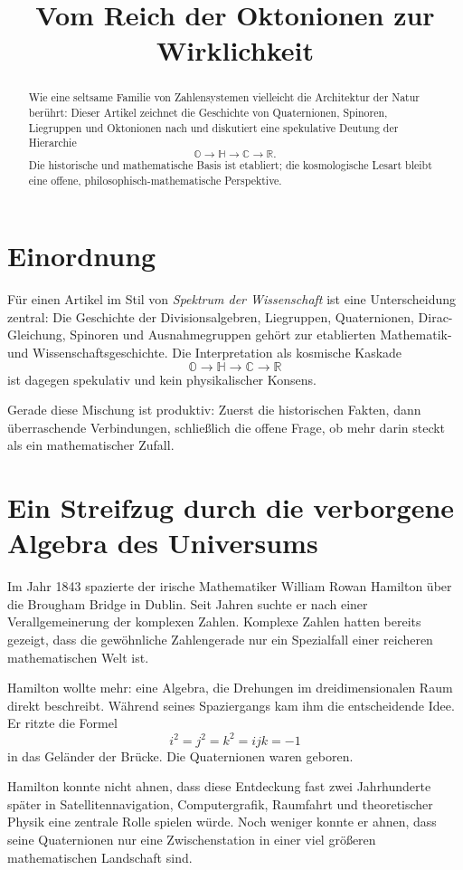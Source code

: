 \documentclass[11pt,a4paper]{article}
\title{Vom Reich der Oktonionen zur Wirklichkeit}
\author{}
\date{}
\begin{document}
\maketitle

\begin{abstract}
Wie eine seltsame Familie von Zahlensystemen vielleicht die Architektur der Natur berührt: Dieser Artikel zeichnet die Geschichte von Quaternionen, Spinoren, Liegruppen und Oktonionen nach und diskutiert eine spekulative Deutung der Hierarchie
\[
\mathbb O \to \mathbb H \to \mathbb C \to \mathbb R.
\]
Die historische und mathematische Basis ist etabliert; die kosmologische Lesart bleibt eine offene, philosophisch-mathematische Perspektive.
\end{abstract}

\section*{Einordnung}
Für einen Artikel im Stil von \emph{Spektrum der Wissenschaft} ist eine Unterscheidung zentral: Die Geschichte der Divisionsalgebren, Liegruppen, Quaternionen, Dirac-Gleichung, Spinoren und Ausnahmegruppen gehört zur etablierten Mathematik- und Wissenschaftsgeschichte. Die Interpretation als kosmische Kaskade
\[
\mathbb O \to \mathbb H \to \mathbb C \to \mathbb R
\]
ist dagegen spekulativ und kein physikalischer Konsens.

Gerade diese Mischung ist produktiv: Zuerst die historischen Fakten, dann überraschende Verbindungen, schließlich die offene Frage, ob mehr darin steckt als ein mathematischer Zufall.

\section{Ein Streifzug durch die verborgene Algebra des Universums}
Im Jahr 1843 spazierte der irische Mathematiker William Rowan Hamilton über die Brougham Bridge in Dublin. Seit Jahren suchte er nach einer Verallgemeinerung der komplexen Zahlen. Komplexe Zahlen hatten bereits gezeigt, dass die gewöhnliche Zahlengerade nur ein Spezialfall einer reicheren mathematischen Welt ist.

Hamilton wollte mehr: eine Algebra, die Drehungen im dreidimensionalen Raum direkt beschreibt. Während seines Spaziergangs kam ihm die entscheidende Idee. Er ritzte die Formel
\[
i^2 = j^2 = k^2 = ijk = -1
\]
in das Geländer der Brücke. Die Quaternionen waren geboren.

Hamilton konnte nicht ahnen, dass diese Entdeckung fast zwei Jahrhunderte später in Satellitennavigation, Computergrafik, Raumfahrt und theoretischer Physik eine zentrale Rolle spielen würde. Noch weniger konnte er ahnen, dass seine Quaternionen nur eine Zwischenstation in einer viel größeren mathematischen Landschaft sind.
\end{document}
